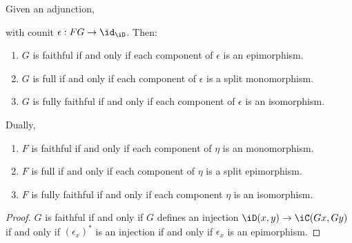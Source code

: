 \documentclass{amsart}
\begin{document}
\begin{lem}
  Given an adjunction,
  
  with counit $\epsilon : FG \to \id_{\iD}$.
  Then:
  \begin{enumerate}
  \item $G$ is faithful if and only if each component of $\epsilon$ is an epimorphism.
  \item $G$ is full if and only if each component of $\epsilon$ is a split monomorphism.
  \item $G$ is fully faithful if and only if each component of $\epsilon$ is an isomorphism.
  \end{enumerate}
  Dually,
  \begin{enumerate}
  \item $F$ is faithful if and only if each component of $\eta$ is an monomorphism.
  \item $F$ is full if and only if each component of $\eta$ is a split epimorphism.
  \item $F$ is fully faithful if and only if each component $\eta$ is an isomorphism.
  \end{enumerate}
\end{lem}
\begin{proof}
  $G$ is faithful if and only if $G$ defines an injection $\iD(x,y) \to \iC(Gx,Gy)$ if and only if $(\epsilon_{x})^{*}$ is an injection if and only if $\epsilon_{x}$ is an epimorphism.
  
\end{proof}



\end{document}
